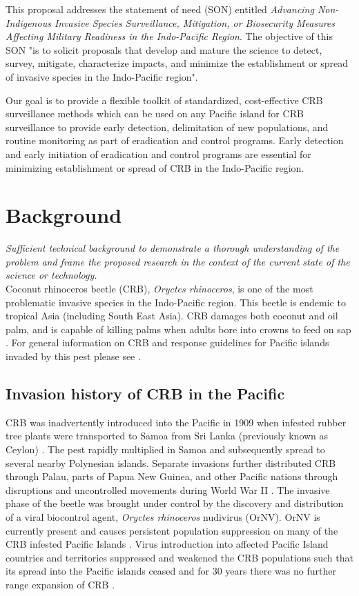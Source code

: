 \documentclass[11pt,english,letterpaper]{scrartcl}
\begin{document}
This proposal addresses the statement of need (SON) entitled \textit{Advancing Non-Indigenous Invasive Species Surveillance, Mitigation, or Biosecurity Measures Affecting Military Readiness in the Indo-Pacific Region}. The objective of this SON "is to solicit proposals that develop and mature the science to detect, survey, mitigate, characterize impacts, and minimize the establishment or spread of invasive species in the Indo-Pacific region".
	
Our goal is to provide a flexible toolkit of standardized, cost-effective CRB surveillance methods which can be used on any Pacific island for CRB surveillance to provide early detection, delimitation of new populations, and routine monitoring as part of eradication and control programs. Early detection and early initiation of eradication and control programs are essential for minimizing establishment or spread of CRB in the Indo-Pacific region. 

\section{Background}

\textit{Sufficient technical background to demonstrate a thorough understanding of the problem and frame the proposed research in the context of the current state of the science or technology.}\\

Coconut rhinoceros beetle (CRB), \textit{Oryctes rhinoceros}, is one of the most problematic invasive species in the Indo-Pacific region. This beetle is endemic to tropical Asia (including South East Asia). CRB damages both coconut and oil palm, and is capable of killing palms when adults bore into crowns to feed on sap \cite{Bedford2013a, Bedford2013b}. For general information on CRB and response guidelines for Pacific islands invaded by this pest please see \cite{Pallipparambil2015,Jackson2020,Moore2023}. 

\subsection{Invasion history of CRB in the Pacific}

CRB was inadvertently introduced into the Pacific in 1909 when infested rubber tree plants were transported to Samoa from Sri Lanka (previously known as Ceylon) \cite{Catley1969}. The pest rapidly multiplied in Samoa and subsequently spread to several nearby Polynesian islands. Separate invasions further distributed CRB through Palau, parts of Papua New Guinea, and other Pacific nations through disruptions and uncontrolled movements during World War II \cite{Catley1969,Gressitt1953}. The invasive phase of the beetle was brought under control by the discovery and distribution of a viral biocontrol agent, \textit{Oryctes rhinoceros} nudivirus (OrNV). OrNV is currently present and causes persistent population suppression on many of the CRB infested Pacific Islands \cite{Bedford2013b,Huger2005}. Virus introduction into affected Pacific Island countries and territories suppressed and weakened the CRB populations such that its spread into the Pacific islands ceased and for 30 years there was no further range expansion of CRB \cite{Vaqalo2015}. 
\end{document}
